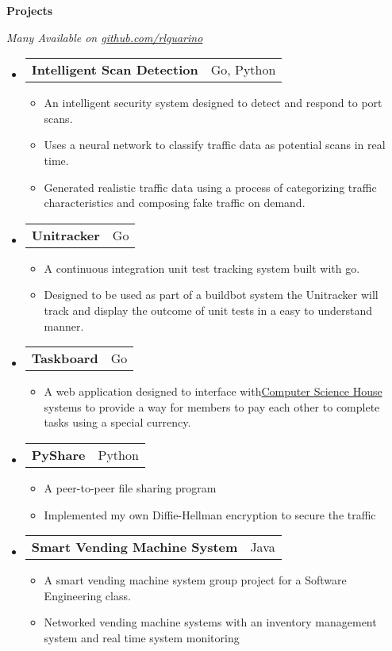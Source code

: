 \documentclass[letterpaper,11pt]{article}
\makeatletter
\newcommand{\resheading}[1]{{\large \colorbox{mygrey}{\begin{minipage}{\textwidth}{\textbf{#1 \vphantom{p\^{E}}}}\end{minipage}}}}
\newcommand{\restwosubheading}[2]{
\begin{tabular*}{6.5in}{l@{\extracolsep{\fill}}r}
		\textbf{#1} & #2 \\
\end{tabular*}\vspace{-6pt}}
\makeatother
\begin{document}
\resheading{Projects}
{ \footnotesize
	\textit{Many Available on {\href{http://www.github.com/rlguarino/}{github.com/rlguarino}}}
	\begin{itemize}
          \item
            \restwosubheading{Intelligent Scan Detection}{Go, Python}
            \begin{itemize}
              \item{An intelligent security system designed to detect and respond to port scans.}
              \item{Uses a neural network to classify traffic data as potential scans in real time. }
              \item{Generated realistic traffic data using a process of categorizing traffic characteristics and composing fake traffic on demand.}
            \end{itemize}

           \item 
	     \restwosubheading{Unitracker }{Go}
	     \begin{itemize}
		\item{A continuous integration unit test tracking system built with go.}
                \item{Designed to be used as part of a buildbot system the Unitracker will track and display the outcome of unit tests in a easy to understand manner.}
	     \end{itemize}
	    \item		
	      \restwosubheading{Taskboard}{Go}
	      \begin{itemize}
		\item{A web application designed to interface with{\href{http://csh.rit.edu}{Computer Science House} } systems to provide a way for members to pay each other to complete tasks using a special currency.} 
	      \end{itemize}
	    \item
	       \restwosubheading{PyShare}{Python}
	       \begin{itemize}
		 \item{A peer-to-peer file sharing program}
                 \item{Implemented my own Diffie-Hellman encryption to secure the traffic}
	       \end{itemize}
	    \item		
	      \restwosubheading{Smart Vending Machine System}{Java}
	      \begin{itemize}
		\item{A smart vending machine system group project for a Software Engineering class.}
                \item{Networked vending machine systems with an inventory management system and real time system monitoring}
	      \end{itemize}
	\end{itemize}
}
\end{document}
